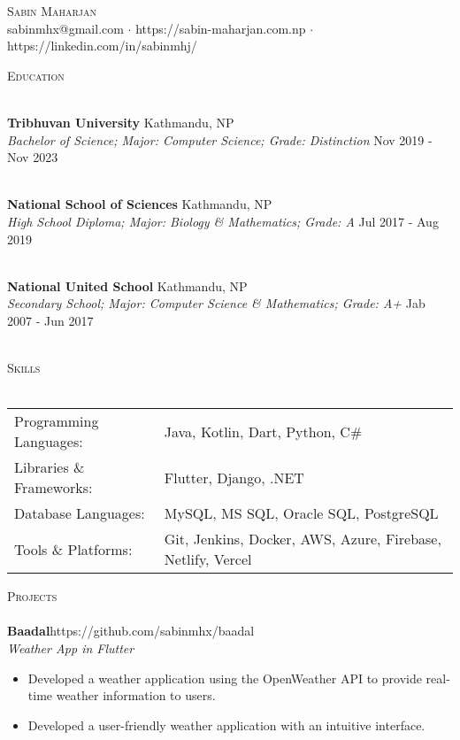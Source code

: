 \documentclass[a4paper]{article}
\newcommand{\lineunder} {
    \vspace*{-8pt} \\
    \hspace*{-18pt} \hrulefill \\
}
\newcommand{\header} [1] {
    {\hspace*{-18pt}\vspace*{6pt} \textsc{#1}}
    \vspace*{-6pt} \lineunder
}
\begin{document}
\vspace*{-40pt}

    

\vspace*{-10pt}
\begin{center}
	{\Huge \scshape {Sabin Maharjan}}\\
	sabinmhx@gmail.com $\cdot$ https://sabin-maharjan.com.np $\cdot$ https://linkedin.com/in/sabinmhj/\\
\end{center}



\header{Education}
\vspace{1mm}

\textbf{Tribhuvan University} \hfill Kathmandu, NP\\
\textit{Bachelor of Science; Major: Computer Science; Grade: Distinction} \hfill Nov 2019 - Nov 2023\\
\vspace{-1mm}
\

\textbf{National School of Sciences} \hfill Kathmandu, NP\\
\textit{High School Diploma; Major: Biology \& Mathematics; Grade: A} \hfill Jul 2017 - Aug 2019\\
\vspace{-1mm}
\

\textbf{National United School} \hfill Kathmandu, NP\\
\textit{Secondary School; Major: Computer Science \& Mathematics; Grade: A+} \hfill Jab 2007 - Jun 2017\\
\vspace{-1mm}
\


\header{Skills}
\begin{tabularx}{\textwidth}{ l X } 
	Programming Languages: & Java, Kotlin, Dart, Python, C\#      \\
	Libraries \& Frameworks:  & Flutter, Django, .NET  \\
    Database Languages:  & MySQL, MS SQL, Oracle SQL, PostgreSQL  \\
    Tools \& Platforms:  & Git, Jenkins, Docker, AWS, Azure, Firebase, Netlify, Vercel \\
\end{tabularx}
\vspace{2mm}

\header{Projects}
{\textbf{Baadal}}\hfill https://github.com/sabinmhx/baadal\\
\textit{Weather App in Flutter}
\begin{itemize} \itemsep 1pt
	\item Developed a weather application using the OpenWeather API to provide real-time weather information to users.   
	\item Developed a user-friendly weather application with an intuitive interface.
\end{itemize}
\end{document}
